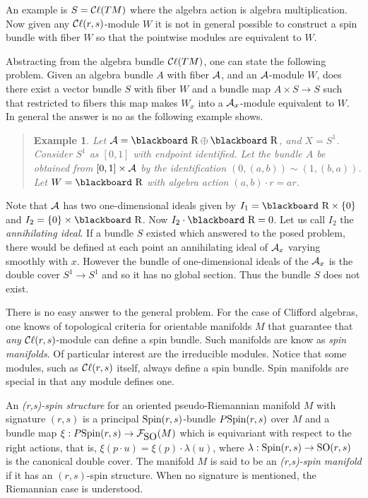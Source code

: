 \documentclass[12pt,titlepage]{article}
\def\bbf#1{\hbox{\blackboard #1}}
\def\lR{\bbf R}
\def\cA{{\cal A}}
\def\cC{{\cal C}}
\def\cF{{\cal F}}
\def\Cl{{\cC\ell}}
\def\SO{\hbox{SO}}
\def\Spin{\hbox{Spin}}
\newtheorem{eg}{Example}
\newenvironment{example}{\begin{quote}\begin{eg}}{\end{eg}\end{quote}}
\begin{document}
An example is \(S=\Cl(TM)\) where the algebra action is algebra
multiplication. Now given any \(\Cl(r,s)\)-module \(W\) it is not in
general possible to construct a spin bundle with fiber \(W\) so that the
pointwise modules are equivalent to \(W\).

Abstracting from the algebra bundle \(\Cl(TM)\), one can state the
following problem. Given an algebra bundle \(A\) with fiber
\(\cA\), and an \(\cA\)-module \(W\), does there exist a vector bundle
\(S\) with fiber \(W\) and a bundle map \(A\times S \to S\) such that
restricted to fibers this map makes \(W_x\) into a 
\(\cA_x\)-module equivalent to \(W\). 
In general the answer is no as the following
example shows.


\begin{example}%
Let \(\cA=\lR\oplus\lR\), and \(X=S^1\). Consider \(S^1\) as \([0,1]\)
with endpoint identified. Let the bundle \(A\) be obtained from
\([0,1]\times\cA\) by the identification \((0,(a,b))\sim (1,(b,a))\).
Let \(W=\lR\) with algebra action \((a,b)\cdot r = ar\).
\end{example}%


Note that \(\cA\) has
two one-dimensional ideals given by \(I_1=\lR\times\{0\}\) and
\(I_2=\{0\}\times \lR\). Now \(I_2\cdot \lR=0\). Let us call \(I_2\) the
{\em annihilating ideal\/}. If a bundle \(S\)
existed which answered to the posed problem, there would be defined at
each point an annihilating ideal of \(\cA_x\) varying smoothly with \(x\).
However the bundle of one-dimensional ideals of the \(\cA_x\) is the double
cover \(S^1\to S^1\)
and so it has no global section. Thus the bundle \(S\)  does not exist.


There is no easy answer to the general problem. For the case of
Clifford algebras, one knows of  topological criteria 
for orientable   manifolds \(M\)
that guarantee that {\em any\/} \(\Cl(r,s)\)-module can define a
spin bundle. Such manifolds are know as {\em spin manifolds\/}.
%
Of particular interest are the irreducible modules. Notice
that some modules, such as \(\Cl(r,s)\) itself, always define a spin
bundle.
Spin manifolds are special in  that any module defines one.

An {\em (r,s)-spin structure\/}
%
 for an oriented
pseudo-Riemannian manifold \(M\) with signature \((r,s)\) is a
principal \(\Spin(r,s)\)-bundle \(P\Spin(r,s)\) over \(M\) and a bundle
map \(\xi:P\Spin(r,s)\to \cF_{\SO}(M)\) which is equivariant with respect to
the right actions, that is, \(\xi(p\cdot u)=\xi(p)\cdot \lambda(u)\),
where \(\lambda:\Spin(r,s)\to \SO(r,s)\) is the canonical double cover. 
The manifold \(M\) is
said to be an {\em (r,s)-spin manifold\/}
%
 if it has an
\((r,s)\)-spin structure. When no signature is mentioned,  the
Riemannian case is understood.
\end{document}
